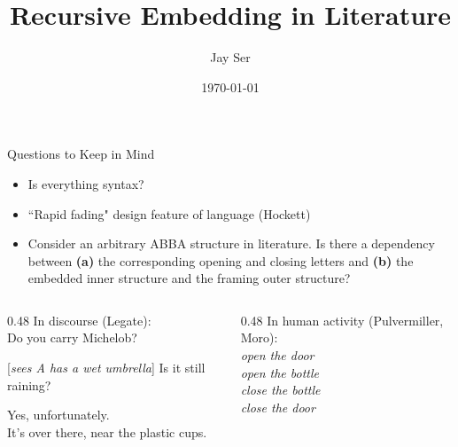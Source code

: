 \documentclass[aspectratio=169]{beamer}
\title{Recursive Embedding in Literature}
\author{Jay Ser}
\date{\today}
\newcommand{\spk}[1]{\makebox[1em][l]{\textbf{#1:}}}
\begin{document}
\begin{frame}[plain]
  \titlepage
\end{frame}

\begin{frame}{Questions to Keep in Mind}
  \begin{itemize}
    \item Is everything syntax?
    \item ``Rapid fading" design feature of language (Hockett)
    \item Consider an arbitrary ABBA structure in literature.
      Is there a dependency between \textbf{(a)} the corresponding
      opening and closing letters and \textbf{(b)} the embedded inner
      structure and the framing outer structure?
  \end{itemize}

  \medskip
  \begin{columns}[T]
    \begin{column}{0.48\textwidth}
      In discourse (Legate): \\ 
      \noindent\spk{A} Do you carry Michelob?\\
      {\setlength{\hangindent}{3.5em}\noindent\hspace{1.5em}\spk{B} [\textit{sees A has a wet umbrella}] Is it still raining?\par}
      \hspace{1.5em}\spk{A} Yes, unfortunately.\\
      \noindent\spk{B} It's over there, near the plastic cups.
    \end{column}

    \begin{column}{0.48\textwidth}
      In human activity (Pulvermiller, Moro): \\
      \textit{\noindent open the door\\
      \hspace{1.5em} open the bottle\\
      \hspace{1.5em} close the bottle\\
    \noindent close the door}
    \end{column}
  \end{columns}
\end{frame}
\end{document}
